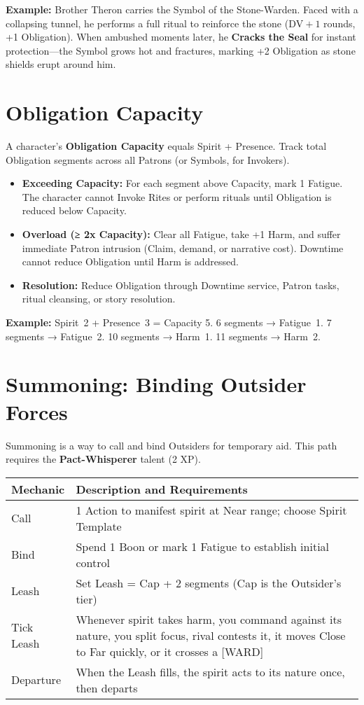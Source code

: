 \textbf{Example:} Brother Theron carries the Symbol of the Stone-Warden. Faced with a collapsing tunnel, he performs a full ritual to reinforce the stone (\(\text{DV} + 1\) rounds, +1 Obligation). When ambushed moments later, he \textbf{Cracks the Seal} for instant protection—the Symbol grows hot and fractures, marking +2 Obligation as stone shields erupt around him.

\section{Obligation Capacity}

A character’s \textbf{Obligation Capacity} equals Spirit + Presence.
Track total Obligation segments across all Patrons (or Symbols, for Invokers).

\begin{itemize}
  \item \textbf{Exceeding Capacity:} For each segment above Capacity, mark 1 Fatigue. The character cannot Invoke Rites or perform rituals until Obligation is reduced below Capacity.
  \item \textbf{Overload (≥ 2x Capacity):} Clear all Fatigue, take +1 Harm, and suffer immediate Patron intrusion (Claim, demand, or narrative cost). Downtime cannot reduce Obligation until Harm is addressed.
  \item \textbf{Resolution:} Reduce Obligation through Downtime service, Patron tasks, ritual cleansing, or story resolution.
\end{itemize}

\textbf{Example:} Spirit~2 + Presence~3 = Capacity 5.
6 segments → Fatigue~1.
7 segments → Fatigue~2.
10 segments → Harm~1.
11 segments → Harm~2.

\section*{Summoning: Binding Outsider Forces}

Summoning is a way to call and bind Outsiders for temporary aid. This path requires the \textbf{Pact-Whisperer} talent (2 XP).

\begin{fatebox}
\begin{tabularx}{\textwidth}{lX}
\toprule
\textbf{Mechanic} & \textbf{Description and Requirements} \\
\midrule
Call & 1 Action to manifest spirit at Near range; choose Spirit Template \\
Bind & Spend 1 Boon or mark 1 Fatigue to establish initial control \\
Leash & Set Leash = Cap + 2 segments (Cap is the Outsider's tier) \\
Tick Leash & Whenever spirit takes harm, you command against its nature, you split focus, rival contests it, it moves Close to Far quickly, or it crosses a [WARD] \\
Departure & When the Leash fills, the spirit acts to its nature once, then departs \\
\bottomrule
\end{tabularx}
\end{fatebox}

